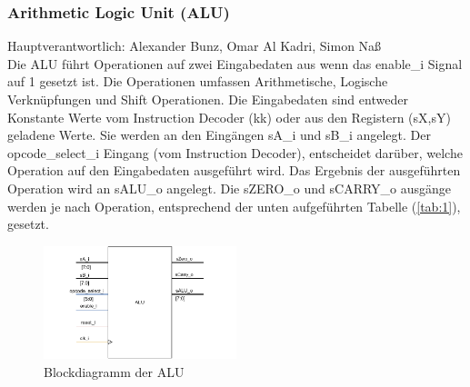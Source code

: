 \documentclass[bibliography=totoc,listof=totoc,index=totoc]{scrartcl}
\begin{document}
\subsubsection{Arithmetic Logic Unit (ALU)}
\begin{multicols}{2}
Hauptverantwortlich: Alexander Bunz, Omar Al Kadri, Simon Naß \\
Die ALU führt Operationen auf zwei Eingabedaten aus wenn das enable\_i Signal auf 1 gesetzt ist. Die Operationen umfassen Arithmetische, Logische Verknüpfungen und Shift Operationen. Die Eingabedaten sind entweder Konstante Werte vom Instruction Decoder (kk) oder aus den Registern (sX,sY) geladene Werte. Sie werden an den Eingängen sA\_i und sB\_i angelegt. Der opcode\_select\_i Eingang (vom Instruction Decoder), entscheidet darüber, welche Operation auf den Eingabedaten ausgeführt wird. Das Ergebnis der ausgeführten Operation wird an sALU\_o angelegt.
Die sZERO\_o und sCARRY\_o ausgänge werden je nach Operation, entsprechend der unten aufgeführten Tabelle (\ref{tab:1}), gesetzt.
\begin{figure}[H]
    \centering
    \includegraphics[width=0.5\textwidth]{ALU_beschreibung.pdf}
    \caption{Blockdiagramm der ALU}
    \label{fig:Block_ALU}
\end{figure}
\end{multicols}
\end{document}
